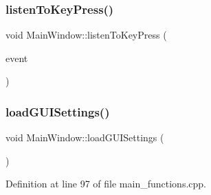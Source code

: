 \subsubsection{\texorpdfstring{listenToKeyPress()}{listenToKeyPress()}}
{\footnotesize\ttfamily void Main\+Window\+::listen\+To\+Key\+Press (\begin{DoxyParamCaption}\item[{Q\+Key\+Event $\ast$}]{event }\end{DoxyParamCaption})\hspace{0.3cm}{\ttfamily [private]}}

\mbox{\label{class_main_window_ad0f8d1384a86ac65b996addd300ef620}} 
\subsubsection{\texorpdfstring{loadGUISettings()}{loadGUISettings()}}
{\footnotesize\ttfamily void Main\+Window\+::load\+G\+U\+I\+Settings (\begin{DoxyParamCaption}{ }\end{DoxyParamCaption})\hspace{0.3cm}{\ttfamily [private]}}



Definition at line 97 of file main\+\_\+functions.\+cpp.

